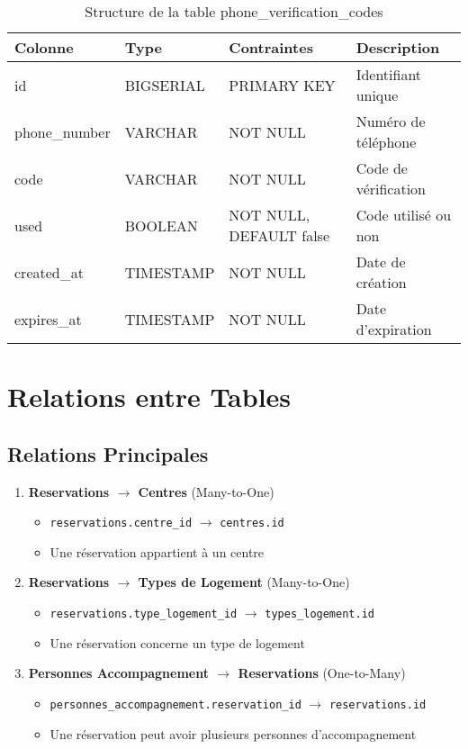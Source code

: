 \documentclass[12pt,a4paper]{article}
\begin{document}
\begin{table}[h]
\centering
\begin{tabular}{|l|l|l|p{6cm}|}
\hline
\textbf{Colonne} & \textbf{Type} & \textbf{Contraintes} & \textbf{Description} \\
\hline
id & BIGSERIAL & PRIMARY KEY & Identifiant unique \\
\hline
phone\_number & VARCHAR & NOT NULL & Numéro de téléphone \\
\hline
code & VARCHAR & NOT NULL & Code de vérification \\
\hline
used & BOOLEAN & NOT NULL, DEFAULT false & Code utilisé ou non \\
\hline
created\_at & TIMESTAMP & NOT NULL & Date de création \\
\hline
expires\_at & TIMESTAMP & NOT NULL & Date d'expiration \\
\hline
\end{tabular}
\caption{Structure de la table phone\_verification\_codes}
\end{table}

\section{Relations entre Tables}

\subsection{Relations Principales}

\begin{enumerate}
    \item \textbf{Reservations $\rightarrow$ Centres} (Many-to-One)
    \begin{itemize}
        \item \texttt{reservations.centre\_id} $\rightarrow$ \texttt{centres.id}
        \item Une réservation appartient à un centre
    \end{itemize}
    
    \item \textbf{Reservations $\rightarrow$ Types de Logement} (Many-to-One)
    \begin{itemize}
        \item \texttt{reservations.type\_logement\_id} $\rightarrow$ \texttt{types\_logement.id}
        \item Une réservation concerne un type de logement
    \end{itemize}
    
    \item \textbf{Personnes Accompagnement $\rightarrow$ Reservations} (One-to-Many)
    \begin{itemize}
        \item \texttt{personnes\_accompagnement.reservation\_id} $\rightarrow$ \texttt{reservations.id}
        \item Une réservation peut avoir plusieurs personnes d'accompagnement
    \end{itemize}
\end{enumerate}
\end{document}
